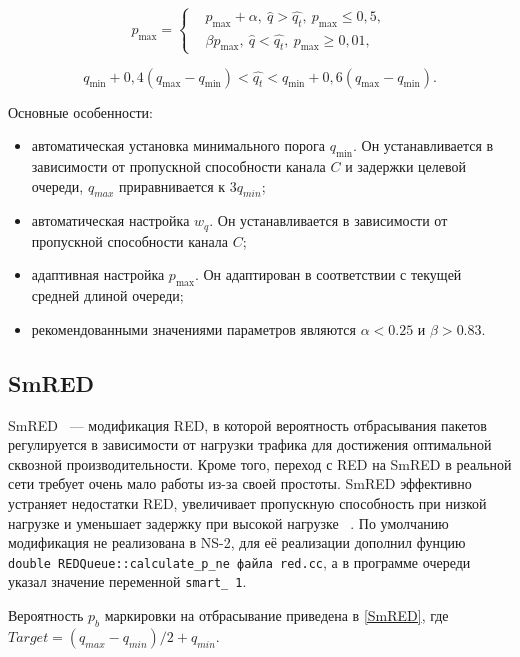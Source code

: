 \begin{equation}
\label{ad1}
p_{\max} = \left\{
  \begin{aligned}
    & p_{\max}+\alpha, \ \hat{q}>\hat{q_{t}}, \ p_{\max} \leqslant 0,5, \\
    & \beta p_{\max}, \ \hat{q}<\hat{q_{t}}, \ p_{\max} \geqslant 0,01, 
  \end{aligned}
\right.
\end{equation}

\begin{equation}
\label{ad2}
q_{\min}+0,4(q_{\max}-q_{\min}) < \hat{q_t} < q_{\min}+0,6\left(q_{\max}-q_{\min}\right).
\end{equation}

Основные особенности: 
\begin{itemize}
\item автоматическая установка минимального порога $q_{\min}$. Он
  устанавливается в зависимости от пропускной способности канала $C$ и
  задержки целевой очереди, $q_{max}$ приравнивается к $3q_{min}$;
\item автоматическая настройка $w_{q}$. Он устанавливается в
  зависимости от пропускной способности канала $C$;
\item адаптивная настройка $p_{\max}$. Он адаптирован в соответствии с
  текущей средней длиной очереди;
\item рекомендованными значениями параметров являются $\alpha < 0.25 $ и $\beta > 0.83 $.
\end{itemize}


\subsection{SmRED}

SmRED ~--- модификация RED, в которой
вероятность отбрасывания пакетов регулируется в зависимости от нагрузки трафика для достижения оптимальной сквозной производительности.
Кроме того, переход с RED на SmRED в реальной сети требует очень мало работы из-за своей простоты. SmRED эффективно устраняет недостатки
RED, увеличивает пропускную способность при низкой нагрузке и уменьшает задержку при высокой нагрузке ~\cite{SmRED}. По умолчанию модификация не реализована в NS-2, для её реализации дополнил фунцию \verb|double REDQueue::calculate_p_ne файла red.cc|, а в программе очереди указал значение переменной \verb|smart_ 1|. 

Вероятность $p_{b}$ маркировки на отбрасывание приведена в \eqref{SmRED}, где $ Target = (q_{max} - q_{min})/2 + q_{min} $.

